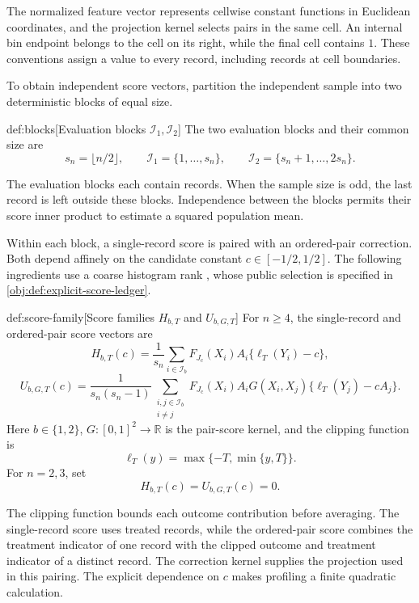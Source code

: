 \documentclass[11pt]{article}
\begin{document}
The normalized feature vector  represents cellwise constant functions in Euclidean coordinates, and the projection kernel  selects pairs in the same cell. An internal bin endpoint belongs to the cell on its right, while the final cell contains \(1\). These conventions assign a value to every record, including records at cell boundaries.

To obtain independent score vectors, partition the independent sample into two deterministic blocks of equal size.

\begin{definitionv}{def:blocks}[Evaluation blocks \(\mathcal I_1,\mathcal I_2\)]
The two evaluation blocks and their common size are
\[
s_n=\lfloor n/2\rfloor,
\qquad
\mathcal I_1=\{1,\ldots,s_n\},
\qquad
\mathcal I_2=\{s_n+1,\ldots,2s_n\}.
\]
\end{definitionv}

The evaluation blocks  each contain  records. When the sample size is odd, the last record is left outside these blocks. Independence between the blocks permits their score inner product to estimate a squared population mean.

Within each block, a single-record score is paired with an ordered-pair correction. Both depend affinely on the candidate constant \(c\in[-1/2,1/2]\). The following ingredients use a coarse histogram rank , whose public selection is specified in \cref{obj:def:explicit-score-ledger}.

\begin{definitionv}{def:score-family}[Score families \(H_{b,T}\) and \(U_{b,G,T}\)]
For \(n\ge4\), the single-record and ordered-pair score vectors are
\[
H_{b,T}(c)=
\frac{1}{s_n}\sum_{i\in\mathcal I_b}
F_{J_{\mathrm c}}(X_i)A_i\{\ell_T(Y_i)-c\},
\]
\[
U_{b,G,T}(c)=
\frac{1}{s_n(s_n-1)}
\sum_{\substack{i,j\in\mathcal I_b\\i\ne j}}
F_{J_{\mathrm c}}(X_i)A_iG(X_i,X_j)
\{\ell_T(Y_j)-cA_j\}.
\]
Here \(b\in\{1,2\}\), \(G:[0,1]^2\to\mathbb R\) is the pair-score kernel, and the clipping function is
\[
\ell_T(y)=\max\{-T,\min\{y,T\}\}.
\]
For \(n=2,3\), set
\[
H_{b,T}(c)=U_{b,G,T}(c)=0.
\]
\end{definitionv}

The clipping function  bounds each outcome contribution before averaging. The single-record score  uses treated records, while the ordered-pair score  combines the treatment indicator of one record with the clipped outcome and treatment indicator of a distinct record. The correction kernel  supplies the projection used in this pairing. The explicit dependence on \(c\) makes profiling a finite quadratic calculation.
\end{document}
